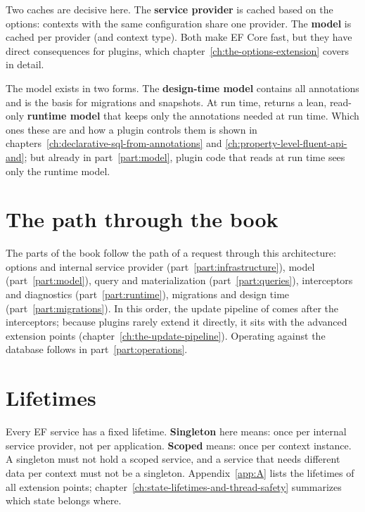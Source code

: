 Two caches are decisive here. The \textbf{service provider} is cached based on the options:
contexts with the same configuration share one provider. The \textbf{model} is cached per
provider (and context type). Both make EF Core fast, but they have direct consequences for
plugins, which chapter~\ref{ch:the-options-extension} covers in detail.

The model exists in two forms. The \textbf{design-time model} contains all annotations and
is the basis for migrations and snapshots. At run time, 
returns a lean, read-only \textbf{runtime model} that keeps only the annotations needed at
run time. Which ones these are and how a plugin controls them is shown in
chapters~\ref{ch:declarative-sql-from-annotations} and \ref{ch:property-level-fluent-api-and};
but already in part~\ref{part:model}, plugin code that reads at run time sees only the
runtime model.

\section{The path through the book}

The parts of the book follow the path of a request through this architecture: options and
internal service provider (part~\ref{part:infrastructure}), model (part~\ref{part:model}),
query and materialization (part~\ref{part:queries}), interceptors and diagnostics
(part~\ref{part:runtime}), migrations and design time (part~\ref{part:migrations}). In this
order, the update pipeline of  comes after the interceptors;
because plugins rarely extend it directly, it sits with the advanced extension points
(chapter~\ref{ch:the-update-pipeline}). Operating against the database follows in
part~\ref{part:operations}.

\section{Lifetimes}

Every EF service has a fixed lifetime. \textbf{Singleton} here means: once per internal
service provider, not per application. \textbf{Scoped} means: once per context instance. A
singleton must not hold a scoped service, and a service that needs different data per
context must not be a singleton. Appendix~\ref{app:A} lists the lifetimes of all extension
points; chapter~\ref{ch:state-lifetimes-and-thread-safety} summarizes which state belongs where.

